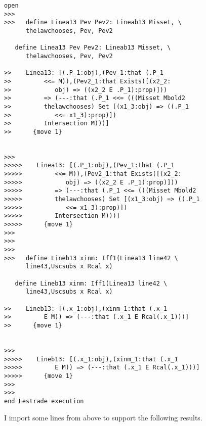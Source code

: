 \documentclass[12pt]{article}
\begin{document}
\begin{verbatim}
open
>>>
>>>   define Linea13 Pev Pev2: Lineab13 Misset, \
      thelawchooses, Pev, Pev2

   define Linea13 Pev Pev2: Lineab13 Misset, \
      thelawchooses, Pev, Pev2

>>    Linea13: [(.P_1:obj),(Pev_1:that (.P_1
>>         <<= M)),(Pev2_1:that Exists([(x2_2:
>>            obj) => ((x2_2 E .P_1):prop)]))
>>         => (---:that (.P_1 <<= (((Misset Mbold2
>>         thelawchooses) Set [(x1_3:obj) => ((.P_1
>>            <<= x1_3):prop)])
>>         Intersection M)))]
>>      {move 1}


>>>
>>>>>    Linea13: [(.P_1:obj),(Pev_1:that (.P_1
>>>>>         <<= M)),(Pev2_1:that Exists([(x2_2:
>>>>>            obj) => ((x2_2 E .P_1):prop)]))
>>>>>         => (---:that (.P_1 <<= (((Misset Mbold2
>>>>>         thelawchooses) Set [(x1_3:obj) => ((.P_1
>>>>>            <<= x1_3):prop)])
>>>>>         Intersection M)))]
>>>>>      {move 1}
>>>
>>>
>>>
>>>   define Lineb13 xinm: Iff1(Linea13 line42 \
      line43,Uscsubs x Rcal x)

   define Lineb13 xinm: Iff1(Linea13 line42 \
      line43,Uscsubs x Rcal x)

>>    Lineb13: [(.x_1:obj),(xinm_1:that (.x_1
>>         E M)) => (---:that (.x_1 E Rcal(.x_1)))]
>>      {move 1}


>>>
>>>>>    Lineb13: [(.x_1:obj),(xinm_1:that (.x_1
>>>>>         E M)) => (---:that (.x_1 E Rcal(.x_1)))]
>>>>>      {move 1}
>>>
>>>
end Lestrade execution
\end{verbatim}

I import some lines from above to support the following results.
\end{document}
